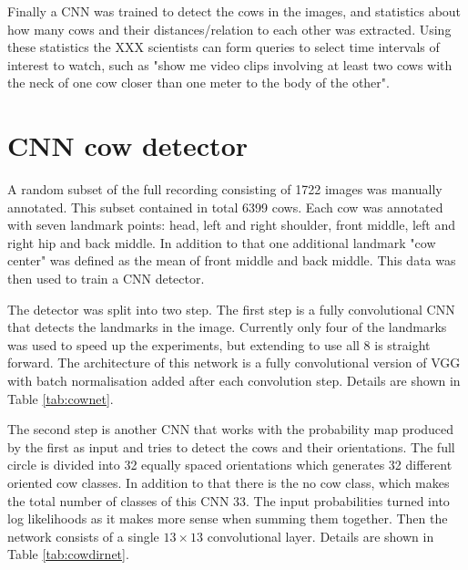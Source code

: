\documentclass[10pt,a4paper,twocolumn]{article}
\begin{document}
Finally a CNN was trained to detect the cows in the images, and statistics about how many cows and their distances/relation to each other was extracted. Using these statistics the XXX scientists can form queries to select time intervals of interest to watch, such as "show me video clips involving at least two cows with the neck of one cow closer than one meter to the body of the other".

\section{CNN cow detector}

A random subset of the full recording consisting of 1722 images was manually annotated. This subset contained in total 6399 cows. Each cow was annotated with seven landmark points: head, left and right shoulder, front middle, left and right hip and back middle. In addition to that one additional landmark "cow center" was defined as the mean of front middle and back middle. This data was then used to train a CNN detector.

The detector was split into two step. The first step is a fully convolutional CNN that detects the landmarks in the image. Currently only four of the landmarks was used to speed up the experiments, but extending to use all 8 is straight forward. The architecture of this network is a fully convolutional version of VGG \cite{FIXME} with batch normalisation \cite{DBLP:journals/corr/IoffeS15} added after each convolution step. Details are shown in Table \ref{tab:cownet}.

The second step is another CNN that works with the probability map produced by the first as input and tries to detect the cows and their orientations. The full circle is divided into 32 equally spaced orientations which generates 32 different oriented cow classes. In addition to that there is the no cow class, which makes the total number of classes of this CNN 33. The input probabilities turned into log likelihoods as it makes more sense when summing them together. Then the network consists of a single $ 13 \times 13 $ convolutional layer. Details are shown in Table \ref{tab:cowdirnet}.
\end{document}
